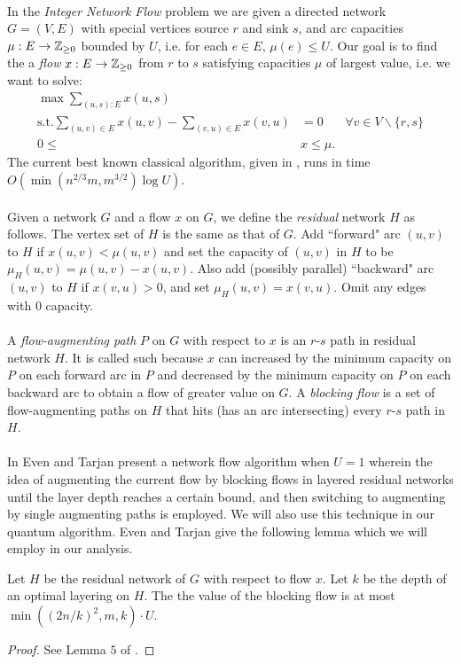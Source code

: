 \paragraph{}
In the {\it Integer Network Flow} problem we are given a directed network $G=(V,E)$ with special vertices source $r$ and sink $s$, and arc capacities $\mu : E \rightarrow \mathbb{Z}_{\geq 0}$ bounded by $U$, i.e. for each $e \in E$, $\mu(e) \leq U$. Our goal is to find the a {\it flow} $x: E \rightarrow \mathbb{Z}_{\geq 0}$ from $r$ to $s$ satisfying capacities $\mu$ of largest value, i.e. we want to solve:
\begin{align*}
\max \sum_{(u,s): E} x(u,s) \\
\text{s.t.} \sum_{(u,v) \in E} x(u,v) - \sum_{(v,u) \in E} x(v,u) &= 0 &\forall v \in V\backslash\{r,s\} \\
0 \leq &x\leq \mu.
\end{align*}
The current best known classical algorithm, given in \cite{goldberg1998beyond}, runs in time $O(\min(n^{2/3}m,m^{3/2})\log U)$.
\paragraph{}
Given a network $G$ and a flow $x$ on $G$, we define the {\it residual} network $H$ as follows. The vertex set of $H$ is the same as that of $G$. Add ``forward" arc $(u,v)$ to $H$ if $ x(u,v) < \mu(u,v)$ and set the capacity of $(u,v)$ in $H$ to be $\mu_H(u,v) = \mu(u,v) - x(u,v)$. Also add (possibly parallel) ``backward" arc $(u,v)$ to $H$ if $x(v,u) > 0$, and set $\mu_H(u,v) = x(v,u)$. Omit any edges with $0$ capacity.
\paragraph{}
A {\it flow-augmenting path} $P$ on $G$ with respect to $x$ is an $r$-$s$ path in residual network $H$. It is called such because $x$ can increased by the minimum capacity on $P$ on each forward arc in $P$ and decreased by the minimum capacity on $P$ on each backward arc to obtain a flow of greater value on $G$. A {\it blocking flow} is a set of flow-augmenting paths on $H$ that hits (has an arc intersecting) every $r$-$s$ path in $H$.
\paragraph{}
In \cite{even1975network} Even and Tarjan present a network flow algorithm when $U=1$ wherein the idea of augmenting the current flow by blocking flows in layered residual networks until the layer depth reaches a certain bound, and then switching to augmenting by single augmenting paths is employed. We will also use this technique in our quantum algorithm. Even and Tarjan give the following lemma which we will employ in our analysis.
\begin{lemma}\label{lemma:5}
\cite{even1975network}\cite{ambainis2006quantum} Let $H$ be the residual network of $G$ with respect to flow $x$. Let $k$ be the depth of an optimal layering on $H$. The the value of the blocking flow is at most $\min((2n/k)^2,m,k)\cdot U$.
\end{lemma}
\begin{proof}
See Lemma $5$ of \cite{ambainis2006quantum}.
\end{proof}
